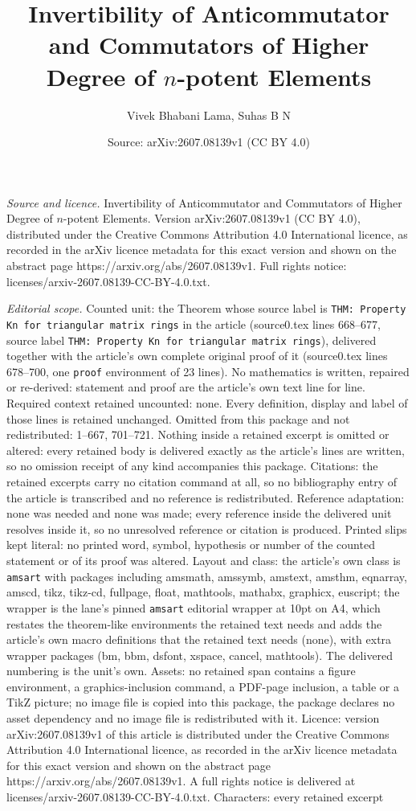 \documentclass[10pt,a4paper]{amsart}
\title[Invertibility of Anticommutator and Commutators of Higher De]{Invertibility of Anticommutator and Commutators of Higher Degree of $n$-potent Elements}
\author{Vivek Bhabani Lama, Suhas B N}
\date{Source: arXiv:2607.08139v1 (CC BY 4.0)}
\begin{document}
\maketitle

\noindent\emph{Source and licence.} Invertibility of Anticommutator and Commutators of Higher Degree of $n$-potent Elements. Version arXiv:2607.08139v1 (CC BY 4.0), distributed under the Creative Commons Attribution 4.0 International licence, as recorded in the arXiv licence metadata for this exact version and shown on the abstract page https://arxiv.org/abs/2607.08139v1. Full rights notice: licenses/arxiv-2607.08139-CC-BY-4.0.txt.\par\smallskip

\noindent\textit{Editorial scope.} Counted unit: the Theorem whose source label is \texttt{THM: Property Kn for triangular matrix rings} in the article (source0.tex lines 668--677, source label \texttt{THM: Property Kn for triangular matrix rings}), delivered together with the article's own complete original proof of it (source0.tex lines 678--700, one \texttt{proof} environment of 23 lines). No mathematics is written, repaired or re-derived: statement and proof are the article's own text line for line. Required context retained uncounted: none. Every definition, display and label of those lines is retained unchanged. Omitted from this package and not redistributed: 1--667, 701--721. Nothing inside a retained excerpt is omitted or altered: every retained body is delivered exactly as the article's lines are written, so no omission receipt of any kind accompanies this package. Citations: the retained excerpts carry no citation command at all, so no bibliography entry of the article is transcribed and no reference is redistributed. Reference adaptation: none was needed and none was made; every reference inside the delivered unit resolves inside it, so no unresolved reference or citation is produced. Printed slips kept literal: no printed word, symbol, hypothesis or number of the counted statement or of its proof was altered. Layout and class: the article's own class is \texttt{amsart} with packages including amsmath, amssymb, amstext, amsthm, eqnarray, amscd, tikz, tikz-cd, fullpage, float, mathtools, mathabx, graphicx, euscript; the wrapper is the lane's pinned \texttt{amsart} editorial wrapper at 10pt on A4, which restates the theorem-like environments the retained text needs and adds the article's own macro definitions that the retained text needs (none), with extra wrapper packages (bm, bbm, dsfont, xspace, cancel, mathtools). The delivered numbering is the unit's own. Assets: no retained span contains a figure environment, a graphics-inclusion command, a PDF-page inclusion, a table or a TikZ picture; no image file is copied into this package, the package declares no asset dependency and no image file is redistributed with it. Licence: version arXiv:2607.08139v1 of this article is distributed under the Creative Commons Attribution 4.0 International licence, as recorded in the arXiv licence metadata for this exact version and shown on the abstract page https://arxiv.org/abs/2607.08139v1. A full rights notice is delivered at licenses/arxiv-2607.08139-CC-BY-4.0.txt. Characters: every retained excerpt 
\end{document}
